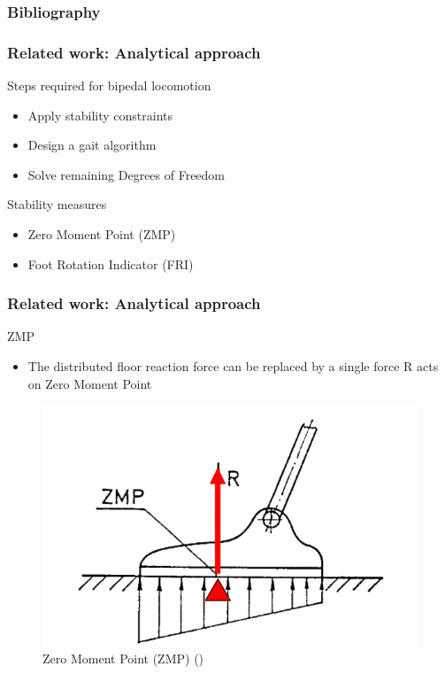 \documentclass{beamer}
\begin{document}
\begin{frame}[allowframebreaks]
	\frametitle{Bibliography}    
	
	
\end{frame}


	\begin{frame}
		\frametitle{Related work: Analytical approach}
		\begin{block}{Steps required for bipedal locomotion}
			\begin{itemize}
				\item
					Apply stability constraints
				\item
					Design a gait algorithm
				\item
					Solve remaining Degrees of Freedom
			\end{itemize}
		\end{block}
		\begin{block}{Stability measures}
			\begin{itemize}
				\item
					Zero Moment Point (ZMP)
				\item
					Foot Rotation Indicator (FRI)
			\end{itemize}
		\end{block}
 	\end{frame}
	

	\begin{frame}
		\frametitle{Related work: Analytical approach}
		\begin{block}{ZMP}
			\begin{itemize}
				\item
					The distributed floor reaction force can be replaced by a single force R
acts on Zero Moment Point
			\end{itemize}
		\end{block}
		
		\begin{figure}[h!]
			\begin{minipage}[H]{\linewidth}
				\centering
				\includegraphics[width=0.5\linewidth]{presentation_images/8}
				\caption{Zero Moment Point (ZMP) (\cite{vukobratovic2004zero})}
			\end{minipage}
		\end{figure}
	\end{frame}
	
\end{document}
